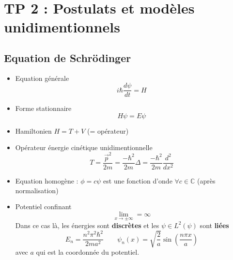 
\section*{TP 2 : Postulats et modèles unidimentionnels}
\subsection*{Equation de Schrödinger}
\begin{itemize}
	\item Equation générale
		\begin{equation}
			i\hbar \frac{d \psi}{dt} = H
		\end{equation}
	
	\item Forme stationnaire
		\begin{equation}
			H\psi = E\psi
		\end{equation}

	\item Hamiltonien $H = T + V$ (= opérateur) 

	\item Opérateur énergie cinétique unidimentionnelle
	\begin{equation}
		T = \frac{\vec{p}^2}{2m} = \frac{- \hbar ^2}{2m}\Delta = \frac{- \hbar ^2}{2m}\frac{d^2}{dx^2}
	\end{equation}

	\item Equation homogène : $\phi = c\psi$ est une fonction d'onde $\forall c \in \mathbb{C}$ (après normalisation)

	\item Potentiel confinant 
		\begin{equation}
			\lim _{x \rightarrow \pm \infty} = \infty
		\end{equation}
		Dans ce cas là, les énergies sont \textbf{discrètes} et les $\psi \in L^2(\psi )$ sont \textbf{liées}
		\begin{equation}
			E_n = \frac{n^2\pi ^2 \hbar ^2}{2ma^2} \qquad \psi _n (x) = \sqrt{\frac{2}{a}} \sin (\frac{n\pi x}{a} )
		\end{equation}
		avec $a$ qui est la coordonnée du potentiel.
\end{itemize}

